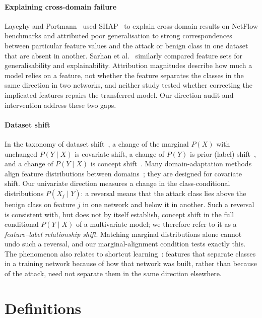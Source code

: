 \documentclass[preprint,12pt]{elsarticle}
\begin{document}
\paragraph{Explaining cross-domain failure}
Layeghy and Portmann~\cite{layeghy2023explainable} used SHAP~\cite{lundberg2017unified} to explain cross-domain results on NetFlow benchmarks and attributed poor generalisation to strong correspondences between particular feature values and the attack or benign class in one dataset that are absent in another. Sarhan et al.~\cite{sarhan2022evaluating} similarly compared feature sets for generalisability and explainability. Attribution magnitudes describe how much a model relies on a feature, not whether the feature separates the classes in the same direction in two networks, and neither study tested whether correcting the implicated features repairs the transferred model. Our direction audit and intervention address these two gaps.

\paragraph{Dataset shift}
In the taxonomy of dataset shift~\cite{quinonero2009dataset,morenotorres2012unifying}, a change of the marginal $P(X)$ with unchanged $P(Y\mid X)$ is covariate shift, a change of $P(Y)$ is prior (label) shift~\cite{lipton2018detecting}, and a change of $P(Y\mid X)$ is concept shift~\cite{gama2014survey}. Many domain-adaptation methods align feature distributions between domains~\cite{ganin2016domain,sun2016return}; they are designed for covariate shift. Our univariate direction measures a change in the class-conditional distributions $P(X_j\mid Y)$: a reversal means that the attack class lies above the benign class on feature $j$ in one network and below it in another. Such a reversal is consistent with, but does not by itself establish, concept shift in the full conditional $P(Y\mid X)$ of a multivariate model; we therefore refer to it as a \emph{feature--label relationship shift}. Matching marginal distributions alone cannot undo such a reversal, and our marginal-alignment condition tests exactly this. The phenomenon also relates to shortcut learning~\cite{geirhos2020shortcut}: features that separate classes in a training network because of how that network was built, rather than because of the attack, need not separate them in the same direction elsewhere.

\section{Definitions}
\label{sec:defs}
\end{document}
